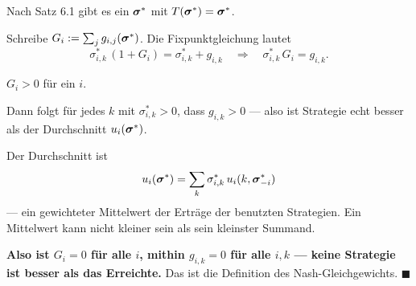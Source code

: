 \begin{merksatz}
Nach Satz 6.1 gibt es ein $\boldsymbol{\sigma}^{*}$ mit $T(\boldsymbol{\sigma}^{*}) = \boldsymbol{\sigma}^{*}$.

Schreibe $G_i := \sum_j g_{i,j}(\boldsymbol{\sigma}^{*})$. Die Fixpunktgleichung lautet
\[ \sigma_{i,k}^{*}\,(1+G_i) = \sigma_{i,k}^{*} + g_{i,k} \quad\Longrightarrow\quad \sigma_{i,k}^{*}\,G_i = g_{i,k} . \]

 $G_i > 0$ für ein $i$.

Dann folgt für jedes $k$ mit $\sigma_{i,k}^{*} > 0$, dass $g_{i,k} > 0$ --- also ist  Strategie echt besser als der Durchschnitt $u_i(\boldsymbol{\sigma}^{*})$.

 Der Durchschnitt ist
\[ u_i(\boldsymbol{\sigma}^{*}) = \sum_k \sigma_{i,k}^{*}\,u_i(k,\boldsymbol{\sigma}_{-i}^{*}) \]
--- ein gewichteter Mittelwert der Erträge der benutzten Strategien. Ein Mittelwert kann nicht kleiner sein als sein kleinster Summand.

\begin{center}
\begin{minipage}{0.9\textwidth}
\textbf{Also ist $G_i = 0$ für alle $i$, mithin $g_{i,k} = 0$ für alle $i,k$ --- keine Strategie ist besser als das Erreichte.} Das ist die Definition des Nash-Gleichgewichts. $\blacksquare$
\end{minipage}
\end{center}

\begin{center}
\begin{minipage}{0.88\textwidth}
\end{minipage}
\end{center}
\end{merksatz}

